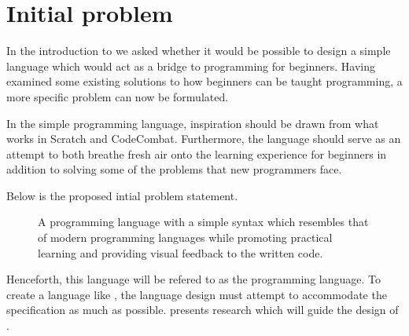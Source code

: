 \section{Initial problem}\label{sec:initial_problem}
In the introduction to  we asked whether it would be possible to design a simple language which would act as a bridge to programming for beginners.
Having examined some existing solutions to how beginners can be taught programming, a more specific problem can now be formulated.

In the simple programming language, inspiration should be drawn from what works in Scratch and CodeCombat. Furthermore, the language should serve as an attempt to both breathe fresh air onto the learning experience for beginners in addition to solving some of the problems that new programmers face.

Below is the proposed intial problem statement.

\begin{figure}[h]
    \vspace{0.5cm}
    \centering
    \begin{framed}
        A programming language with a simple syntax which resembles that of modern programming languages while promoting practical learning and providing visual feedback to the written code.
    \end{framed}
    \vspace{-0.5cm}
    \label{fig:dazel_specification}
    \vspace{0.5cm}
\end{figure}

Henceforth, this language will be refered to as the \dazel{} programming language.
To create a language like \dazel{}, the language design must attempt to accommodate the specification as much as possible.  presents research which will guide the design of \dazel{}.